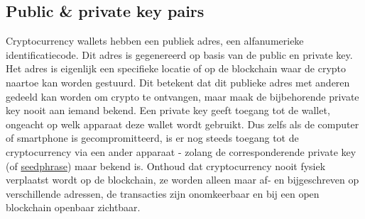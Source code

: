 \subsection{Public \& private key pairs}

Cryptocurrency wallets hebben een publiek adres, een alfanumerieke identificatiecode. Dit adres is gegenereerd op basis van de public en private key. Het adres is eigenlijk een specifieke locatie of  op de blockchain waar de crypto naartoe kan worden gestuurd. Dit betekent dat dit publieke adres met anderen gedeeld kan worden om crypto te ontvangen, maar maak de bijbehorende private key nooit aan iemand bekend. Een private key geeft toegang tot de wallet, ongeacht op welk apparaat deze wallet wordt gebruikt. Dus zelfs als de computer of smartphone is gecompromitteerd, is er nog steeds toegang tot de cryptocurrency via een ander apparaat - zolang de corresponderende private key (of \href{https://www.binance.vision/glossary/seed-phrase}{seedphrase}) maar bekend is. Onthoud dat cryptocurrency nooit fysiek verplaatst wordt op de blockchain, ze worden alleen maar af- en bijgeschreven op verschillende adressen, de transacties zijn onomkeerbaar en bij een open blockchain openbaar zichtbaar.

            
